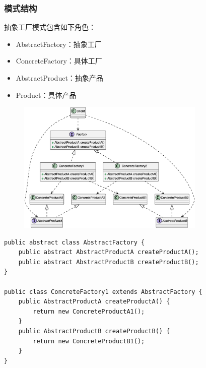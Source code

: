 \subsubsection{模式结构}
抽象工厂模式包含如下角色：
\vspace{-0.8em}
\begin{multicols}{2}
    \begin{itemize}
        \item AbstractFactory：抽象工厂
        \item ConcreteFactory：具体工厂
        \item AbstractProduct：抽象产品
        \item Product：具体产品
    \end{itemize}
\end{multicols}
\vspace{-1em}

\begin{figure}[H]
    \vspace{-0.5em}
	\centering
	\includegraphics[width=0.8\textwidth]{images/抽象工厂模式.eps}
    \vspace{-1em}
\end{figure}

\begin{lstlisting}
public abstract class AbstractFactory {
    public abstract AbstractProductA createProductA();
    public abstract AbstractProductB createProductB();
}

public class ConcreteFactory1 extends AbstractFactory {
    public AbstractProductA createProductA() {
        return new ConcreteProductA1(); 
    }
    public AbstractProductB createProductB() {
        return new ConcreteProductB1(); 
    }
}
\end{lstlisting}

